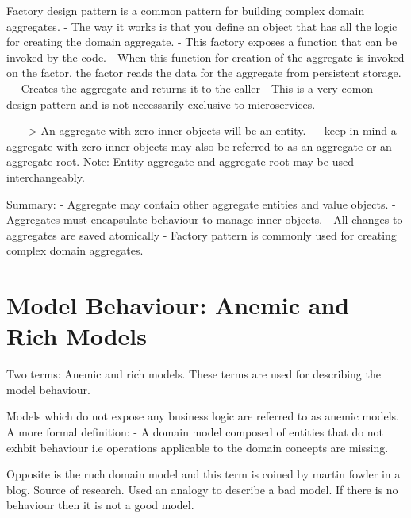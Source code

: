\documentclass[a4paper, 11pt]{book}
\begin{document}
    Factory design pattern is a common pattern for building complex domain aggregates.
    - The way it works is that you define an object that has all the logic for creating the domain aggregate.
    - This factory exposes a function that can be invoked by the code.
    - When this function for creation of the aggregate is invoked on the factor, the factor reads the data for the aggregate from persistent storage.
    --- Creates the aggregate and returns it to the caller
    - This is a very comon design pattern and is not necessarily exclusive to microservices.

    ------> An aggregate with zero inner objects will be an entity.
    --- keep in mind a aggregate with zero inner objects may also be referred to as an aggregate or an aggregate root.
    Note: Entity aggregate and aggregate root may be used interchangeably.

    Summary:
    - Aggregate may contain other aggregate entities and value objects.
    - Aggregates must encapsulate behaviour to manage inner objects.
    - All changes to aggregates are saved atomically
    - Factory pattern is commonly used for creating complex domain aggregates.



    \section{Model Behaviour: Anemic and Rich Models}

    Two terms: Anemic and rich models.
    These terms are used for describing the model behaviour.

    Models which do not expose any business logic are referred to as anemic models.
    A more formal definition:
    - A domain model composed of entities that do not exhbit behaviour i.e operations applicable to the domain concepts are missing.

    Opposite is the ruch domain model and this term is coined by martin fowler in a blog. Source of research.
    Used an analogy to describe a bad model.
    If there is no behaviour then it is not a good model.
\end{document}

